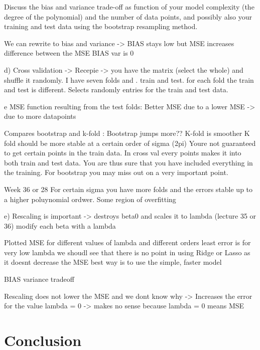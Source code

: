 \documentclass[reprint,english,notitlepage]{revtex4-1}  %
\begin{document}
        
    Discuss the bias and variance trade-off as function of your model complexity
(the degree of the polynomial) and the number of data points, and possibly also
your training and test data using the bootstrap resampling method.

We can rewrite to bias and variance -> BIAS stays low but MSE increases 
difference between the MSE BIAS var is 0 

d) 
Cross validation -> Recepie -> you have the matrix (select the whole) and shuffle it randomly. I have seven folds and . train and test. for each fold the train and test is different. Selects randomly entries for the train and test data. 

e MSE function resulting from the test folds: Better MSE due to a lower MSE -> due to more datapoints

Compares bootstrap and k-fold : Bootstrap jumps more?? K-fold is smoother 
    K fold should be more stable at a certain order of sigma (2pi) 
    Youre not guaranteed to get certain points in the train data. In cross val every points makes it into both train and test data. You are thus sure that you have included everything in the training. For bootstrap you may miss out on a very important point. 
    
    Week 36 or 28 
    For certain sigma you have more folds and the errors stable up to a higher poluynomial ordwer. 
        Some region of overfitting 

e) Rescaling is important -> destroys beta0 and scales it to lambda (lecture 35 or 36) 
    modify each beta with a lambda 
    
    Plotted MSE for different values of lambda and different orders 
    least error is for very low lambda 
    we shoudl see that there is no point in using Ridge or Lasso as it doesnt decrease the MSE 
    best way is to use the simple, faster model 
    
    BIAS variance tradeoff 
    
Rescaling does not lower the MSE and we dont know why -> Increases the error for the value lambda = 0 -> makes no sense because lambda = 0 means MSE 
    

    




\section{Conclusion}\label{sec:conclusion}
\end{document}

